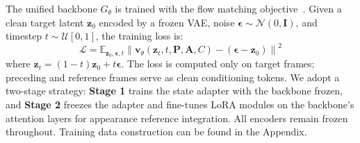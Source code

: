 The unified backbone $G_{\theta}$ is trained with the flow matching objective~\cite{sd3}. Given a clean target latent $\mathbf{z}_0$ encoded by a frozen VAE, noise $\boldsymbol{\epsilon} \sim \mathcal{N}(0, \mathbf{I})$, and timestep $t \sim \mathcal{U}[0,1]$, the training loss is:
\vspace{-0.5mm}
\begin{equation}
    \mathcal{L} = \mathbb{E}_{\mathbf{z}_0, \boldsymbol{\epsilon}, t} \left\| \mathbf{v}_\theta(\mathbf{z}_t, t, \mathbf{P}, \mathbf{A}, C) - (\boldsymbol{\epsilon} - \mathbf{z}_0) \right\|^2
\end{equation}
where $\mathbf{z}_t = (1-t)\mathbf{z}_0 + t\boldsymbol{\epsilon}$. The loss is computed only on target frames; preceding and reference frames serve as clean conditioning tokens. We adopt a two-stage strategy: \textbf{Stage 1} trains the state adapter with the backbone frozen, and \textbf{Stage 2} freezes the adapter and fine-tunes LoRA modules on the backbone's attention layers for appearance reference integration. All encoders remain frozen throughout. Training data construction can be found in the Appendix.